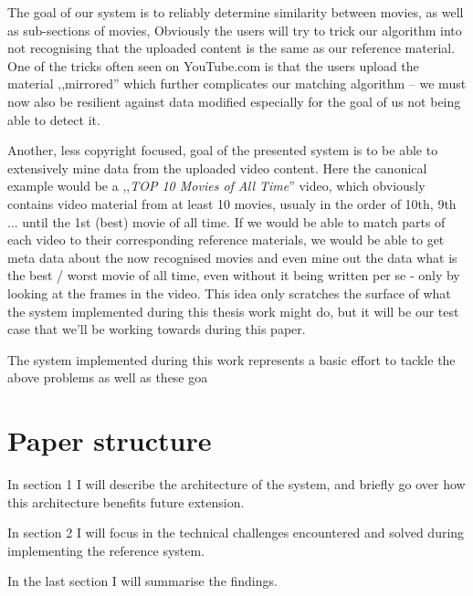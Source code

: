 The goal of our system is to reliably determine similarity between movies, as well as sub-sections of movies,
Obviously the users will try to trick our algorithm into not recognising that the uploaded content is the same as our reference material. One of the tricks
often seen on YouTube.com is that the users upload the material ,,mirrored'' which further complicates our matching algorithm -- we must now also be 
resilient against data modified especially for the goal of us not being able to detect it.

Another, less copyright focused, goal of the presented system is to be able to extensively mine data from the uploaded video content.
Here the canonical example would be a ,,\textit{TOP 10 Movies of All Time}'' video, which obviously contains video material from at least 10 movies,
usualy in the order of 10th, 9th ... until the 1st (best) movie of all time. If we would be able to match parts of each video to their corresponding 
reference materials, we would be able to get meta data about the now recognised movies and even mine out the data what is the best / worst movie of all time,
even without it being written per se - only by looking at the frames in the video. This idea only scratches the surface of what the system implemented during
this thesis work might do, but it will be our test case that we'll be working towards during this paper.

The system implemented during this work represents a basic effort to tackle the above problems as well as these goa

\section{Paper structure}
In section 1 I will describe the architecture of the system, and briefly go over how this architecture benefits future extension.

In section 2 I will focus in the technical challenges encountered and solved during implementing the reference system.

In the last section I will summarise the findings.


